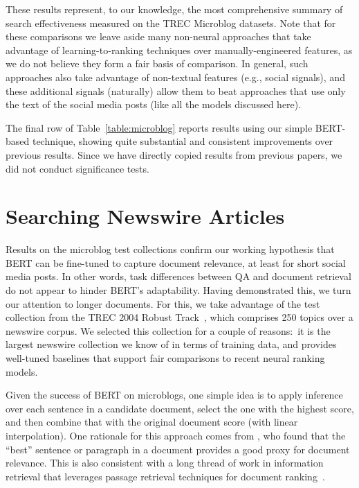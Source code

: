 \documentclass[11pt,a4paper]{article}
\begin{document}
These results represent, to our knowledge, the most comprehensive summary of search effectiveness measured on the TREC Microblog datasets.
Note that for these comparisons we leave aside many non-neural approaches that take advantage of learning-to-ranking techniques over manually-engineered features, as we do not believe they form a fair basis of comparison.
In general, such approaches also take advantage of non-textual features (e.g., social signals), and these additional signals (naturally) allow them to beat approaches that use only the text of the social media posts (like all the models discussed here).

The final row of Table~\ref{table:microblog} reports results using our simple BERT-based technique, showing quite substantial and consistent improvements over previous results.
Since we have directly copied results from previous papers, we did not conduct significance tests.


\section{Searching Newswire Articles}

Results on the microblog test collections confirm our working hypothesis that BERT can be fine-tuned to capture document relevance, at least for short social media posts.
In other words, task differences between QA and document retrieval do not appear to hinder BERT's adaptability.
Having demonstrated this, we turn our attention to longer documents.
For this, we take advantage of the test collection from the TREC 2004 Robust Track~\cite{Voorhees_TREC2004_robust}, which comprises 250 topics over a newswire corpus.
We selected this collection for a couple of reasons:\ it is the largest newswire collection we know of in terms of training data, and \citet{Lin_SIGIRForum2018} provides well-tuned baselines that support fair comparisons to recent neural ranking models.

Given the success of BERT on microblogs, one simple idea is to apply inference over each sentence in a candidate document, select the one with the highest score, and then combine that with the original document score (with linear interpolation).
One rationale for this approach comes from \citet{dblp:journals/corr/abs-1803-08988,Zhang:2018:EUI:3269206.3271796}, who found that the ``best'' sentence or paragraph in a document provides a good proxy for document relevance.
This is also consistent with a long thread of work in information retrieval that leverages passage retrieval techniques for document ranking~\citep{Callan_SIGIR1994,Clarke00a,liu2002passage}. 
\end{document}
